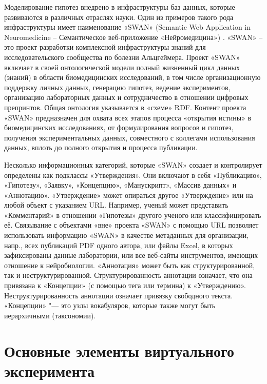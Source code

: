 Моделирование гипотез внедрено в инфраструктуры баз данных, которые развиваются в различных отраслях науки. Один из 
примеров такого рода инфраструктуры имеет наименование «SWAN» (Semantic Web Application in Neuromedicine – 
Семантическое веб-приложение «Нейромедицина») \cite{gao2006swan}. «SWAN» – это проект разработки комплексной 
инфраструктуры знаний для исследовательского сообщества по болезни Альцгеймера. Проект «SWAN» включает в своей 
онтологической модели полный жизненный цикл данных (знаний) в области биомедицинских исследований, в том числе 
организационную поддержку личных данных, генерацию гипотез, ведение экспериментов, организацию лабораторных данных 
и сотрудничество в отношении цифровых препринтов. Общая онтология указывается в «схеме» RDF. Контент проекта «SWAN» 
предназначен для охвата всех этапов процесса «открытия истины» в биомедицинских исследованиях, от формулирования 
вопросов и гипотез, получения экспериментальных данных, совместного с коллегами использования данных, вплоть до полного 
открытия и процесса публикации.

Несколько информационных категорий, которые «SWAN» создает и контролирует определены как подклассы «Утверждения». 
Они включают в себя «Публикацию», «Гипотезу», «Заявку», «Концепцию», «Манускрипт», «Массив данных» и «Аннотацию». 
«Утверждение» может опираться другое «Утверждение» или на любой объект с указанием URL. Например, ученый может 
представить «Комментарий» в отношении «Гипотезы» другого ученого или классифицировать её. Связывание с объектами 
«вне» проекта «SWAN» с помощью URL позволяет использовать информацию «SWAN» в качестве метаданных для организации, 
напр., всех публикаций PDF одного автора, или файлы Excel, в которых зафиксированы данные лаборатории, или все 
веб-сайты инструментов, имеющих отношение к нейробиологии. «Аннотация» может быть как структурированной, так и 
неструктурированной. Структурированность аннотации означает, что она привязана к «Концепции» (с помощью тега или 
термина) к «Утверждению». Неструктурированность аннотации означает привязку свободного текста. 
«Концепции» "--- это узлы вокабуляров, которые также могут быть иерархичными (таксономии).


\section{Основные элементы виртуального эксперимента} \label{sect2_1}

